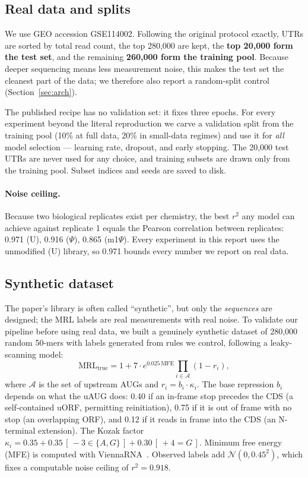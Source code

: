 \documentclass{article}
\begin{document}
\subsection{Real data and splits}
We use GEO accession GSE114002. Following the original protocol exactly, UTRs are sorted by
total read count, the top 280{,}000 are kept, the \textbf{top 20{,}000 form the test set},
and the remaining \textbf{260{,}000 form the training pool}. Because deeper sequencing means
less measurement noise, this makes the test set the cleanest part of the data; we therefore
also report a random-split control (Section~\ref{sec:arch}).

The published recipe has no validation set: it fixes three epochs. For every experiment
beyond the literal reproduction we carve a validation split from the training pool
(10\% at full data, 20\% in small-data regimes) and use it for \emph{all} model selection ---
learning rate, dropout, and early stopping. The 20{,}000 test UTRs are never used for any
choice, and training subsets are drawn only from the training pool. Subset indices and seeds
are saved to disk.

\paragraph{Noise ceiling.} Because two biological replicates exist per chemistry, the best
$r^2$ any model can achieve against replicate 1 equals the Pearson correlation between
replicates: 0.971 (U), 0.916 ($\Psi$), 0.865 (m1$\Psi$). Every experiment in this report
uses the unmodified (U) library, so 0.971 bounds every number we report on real data.

\subsection{Synthetic dataset}
\label{sec:synth}
The paper's library is often called ``synthetic'', but only the \emph{sequences} are
designed; the MRL labels are real measurements with real noise. To validate our pipeline
before using real data, we built a genuinely synthetic dataset of 280{,}000 random 50-mers
with labels generated from rules we control, following a leaky-scanning model:
\begin{equation}
\mathrm{MRL}_{\text{true}} = 1 + 7 \cdot e^{0.025\,\mathrm{MFE}} \prod_{i \in \mathcal{A}} (1 - r_i),
\end{equation}
where $\mathcal{A}$ is the set of upstream AUGs and $r_i = b_i \cdot \kappa_i$. The base
repression $b_i$ depends on what the uAUG does: 0.40 if an in-frame stop precedes the CDS
(a self-contained uORF, permitting reinitiation), 0.75 if it is out of frame with no stop
(an overlapping ORF), and 0.12 if it reads in frame into the CDS (an N-terminal extension).
The Kozak factor $\kappa_i = 0.35 + 0.35\,[\,-3 \in \{A,G\}\,] + 0.30\,[\,+4 = G\,]$.
Minimum free energy (MFE) is computed with ViennaRNA~\citep{lorenz2011}. Observed labels add
$\mathcal{N}(0, 0.45^2)$, which fixes a computable noise ceiling of $r^2 = 0.918$.
\end{document}
